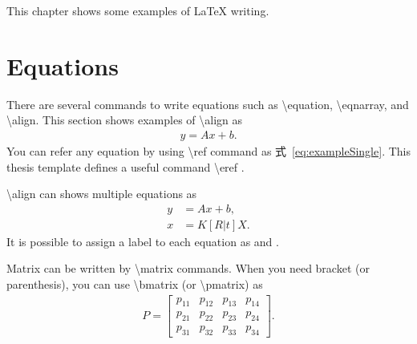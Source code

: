 ﻿This chapter shows some examples of \LaTeX{} writing.

\section{Equations}
There are several commands to write equations such as \textbackslash{}equation, \textbackslash{}eqnarray, and \textbackslash{}align.
This section shows examples of \textbackslash{}align as
\begin{align}
y = Ax+b.
\label{eq:exampleSingle}
\end{align}
You can refer any equation by using \textbackslash{}ref command as 式~\ref{eq:exampleSingle}.
This thesis template defines a useful command \textbackslash{}eref .

\par
\textbackslash{}align can shows multiple equations as
\begin{align}
y &= Ax+b ,
\label{eq:exampleMultiple1} \\
x &= K[R|t]X.
\label{eq:exampleMultiple2}
\end{align}
It is possible to assign a label to each equation as  and .

\par
Matrix can be written by \textbackslash{}matrix commands.
When you need bracket (or parenthesis), you can use \textbackslash{}bmatrix (or \textbackslash{}pmatrix) as
\begin{align}
  P = 
	\begin{bmatrix}
		p_{11} & p_{12} & p_{13} & p_{14} \\
		p_{21} & p_{22} & p_{23} & p_{24} \\
		p_{31} & p_{32} & p_{33} & p_{34} 
	\end{bmatrix}.
\label{eq:exampleMatrix}
\end{align}

